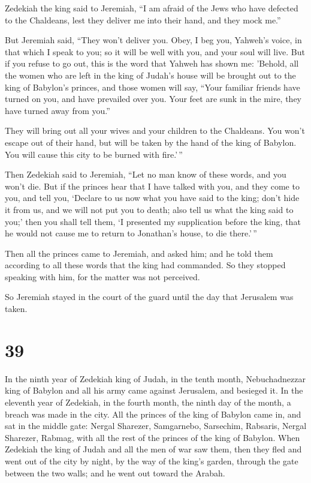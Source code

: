  Zedekiah the king said to Jeremiah, ``I am afraid of the
Jews who have defected to the Chaldeans, lest they deliver me into their
hand, and they mock me.''

 But Jeremiah said, ``They won't deliver you. Obey, I beg
you, Yahweh's voice, in that which I speak to you; so it will be well
with you, and your soul will live.  But if you refuse to
go out, this is the word that Yahweh has shown me: 
'Behold, all the women who are left in the king of Judah's house will be
brought out to the king of Babylon's princes, and those women will say,
``Your familiar friends have turned on you, and have prevailed over you.
Your feet are sunk in the mire, they have turned away from you.''

 They will bring out all your wives and your children to
the Chaldeans. You won't escape out of their hand, but will be taken by
the hand of the king of Babylon. You will cause this city to be burned
with fire.'\,''

 Then Zedekiah said to Jeremiah, ``Let no man know of
these words, and you won't die.  But if the princes hear
that I have talked with you, and they come to you, and tell you,
`Declare to us now what you have said to the king; don't hide it from
us, and we will not put you to death; also tell us what the king said to
you;'  then you shall tell them, `I presented my
supplication before the king, that he would not cause me to return to
Jonathan's house, to die there.'\,''

 Then all the princes came to Jeremiah, and asked him;
and he told them according to all these words that the king had
commanded. So they stopped speaking with him, for the matter was not
perceived.

 So Jeremiah stayed in the court of the guard until the
day that Jerusalem was taken.

\hypertarget{section-38}{%
\section{39}\label{section-38}}

 In the ninth year of Zedekiah king of Judah, in the tenth
month, Nebuchadnezzar king of Babylon and all his army came against
Jerusalem, and besieged it.  In the eleventh year of
Zedekiah, in the fourth month, the ninth day of the month, a breach was
made in the city.  All the princes of the king of Babylon
came in, and sat in the middle gate: Nergal Sharezer, Samgarnebo,
Sarsechim, Rabsaris, Nergal Sharezer, Rabmag, with all the rest of the
princes of the king of Babylon.  When Zedekiah the king of
Judah and all the men of war saw them, then they fled and went out of
the city by night, by the way of the king's garden, through the gate
between the two walls; and he went out toward the Arabah.

